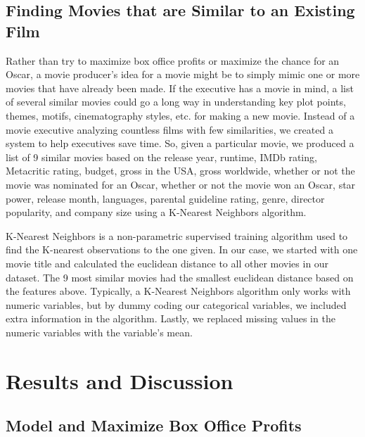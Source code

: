 \documentclass[10pt]{article}
\begin{document}
\subsection{Finding Movies that are Similar to an Existing Film}

Rather than try to maximize box office profits or maximize the chance for an Oscar, a movie producer’s idea for a movie might be to simply mimic one or more movies that have already been made. If the executive has a movie in mind, a list of several similar movies could go a long way in understanding key plot points, themes, motifs, cinematography styles, etc. for making a new movie. Instead of a movie executive analyzing countless films with few similarities, we created a system to help executives save time. So, given a particular movie, we produced a list of 9 similar movies based on the release year, runtime, IMDb rating, Metacritic rating, budget, gross in the USA, gross worldwide, whether or not the movie was nominated for an Oscar, whether or not the movie won an Oscar, star power, release month, languages, parental guideline rating, genre, director popularity, and company size using a K-Nearest Neighbors algorithm.

K-Nearest Neighbors is a non-parametric supervised training algorithm used to find the K-nearest observations to the one given. In our case, we started with one movie title and calculated the euclidean distance to all other movies in our dataset. The 9 most similar movies had the smallest euclidean distance based on the features above. Typically, a K-Nearest Neighbors algorithm only works with numeric variables, but by dummy coding our categorical variables, we included extra information in the algorithm. Lastly, we replaced missing values in the numeric variables with the variable’s mean. 

\section{Results and Discussion}
\subsection{Model and Maximize Box Office Profits}
\end{document}
